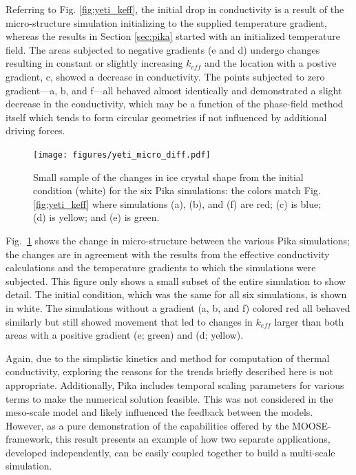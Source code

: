 Referring to Fig. \ref{fig:yeti_keff}, the initial drop in conductivity is a result of the micro-structure simulation initializing to the supplied temperature gradient, whereas the results in Section \ref{sec:pika} started with an initialized temperature field. The areas subjected to negative gradients (e and d) undergo changes resulting in constant or slightly increasing $k_{eff}$ and the location with a postive gradient, c, showed a decrease in conductivity. The points subjected to zero gradient---a, b, and f---all behaved almost identically and demonstrated a slight decrease in the conductivity, which may be a function of the phase-field method itself which tends to form circular geometries if not influenced by additional driving forces.

\begin{figure}[t]
  \texttt{[image: figures/yeti\_micro\_diff.pdf]}
  \caption{Small sample of the changes in ice crystal shape from the initial condition (white) for the six Pika simulations: the colors match Fig. \ref{fig:yeti_keff} where simulations (a), (b), and (f) are red; (c) is blue; (d) is yellow; and (e) is green.}
  \label{fig:yeti_micro}
\end{figure}

Fig.~\ref{fig:yeti_micro} shows the change in micro-structure between the various Pika simulations; the changes are in agreement with the results from the effective conductivity calculations and the temperature gradients to which the simulations were subjected. This figure only shows a small subset of the entire simulation to show detail. The initial condition, which was the same for all six simulations, is shown in white. The simulations without a gradient (a, b, and f) colored red all behaved similarly but still showed movement that led to changes in $k_{eff}$ larger than both areas with a positive gradient (e; green) and (d; yellow).

Again, due to the simplistic kinetics and method for computation of thermal conductivity, exploring the reasons for the trends briefly described here is not appropriate. Additionally, Pika includes temporal scaling parameters for various terms to make the numerical solution feasible. This was not considered in the meso-scale model and likely influenced the feedback between the models. However, as a pure demonstration of the capabilities offered by the MOOSE-framework, this result presents an example of how two separate applications, developed independently, can be easily coupled together to build a multi-scale simulation.



